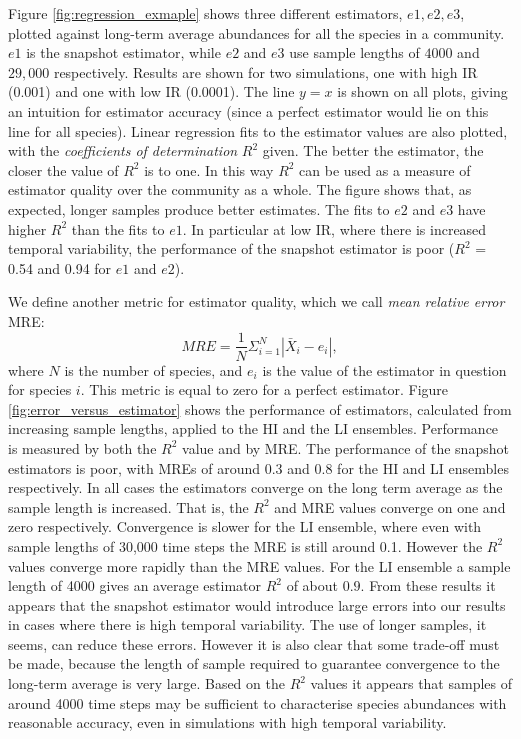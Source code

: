 Figure \ref{fig:regression_exmaple} shows three different estimators, $e1,e2,e3$, plotted against long-term average abundances for all the species in a community. $e1$ is the snapshot estimator, while $e2$ and $e3$ use sample lengths of $4000$ and $29,000$ respectively. Results are shown for two simulations, one with high IR (0.001) and one with low IR (0.0001). The line $y=x$ is shown on all plots, giving an intuition for estimator accuracy (since a perfect estimator would lie on this line for all species). Linear regression fits to the estimator values are also plotted, with the \emph{coefficients of determination} $R^2$ given. The better the estimator, the closer the value of $R^2$ is to one. In this way $R^2$ can be used as a measure of estimator quality over the community as a whole. The figure shows that, as expected, longer samples produce better estimates. The fits to $e2$ and $e3$ have higher $R^2$ than the fits to $e1$. In particular at low IR, where there is increased temporal variability, the performance of the snapshot estimator is poor ($R^2$ = 0.54 and 0.94 for $e1$ and $e2$).

 We define another metric for estimator quality, which we call \emph{mean relative error} MRE:
\begin{equation}
MRE = \frac{1}{N} \Sigma_{i=1}^N | \bar{X}_i - e_i |,
\label{eq:lta}
\end{equation}
%
where $N$ is the number of species, and $e_i$ is the value of the estimator in question for species $i$. This metric is equal to zero for a perfect estimator. Figure \ref{fig:error_versus_estimator} shows the performance of estimators, calculated from increasing sample lengths, applied to the HI and the LI ensembles. Performance is measured by both the $R^2$ value and by MRE. The performance of the snapshot estimators is poor, with MREs of around $0.3$ and $0.8$ for the HI and LI ensembles respectively. In all cases the estimators converge on the long term average as the sample length is increased. That is, the $R^2$ and MRE values converge on one and zero respectively. Convergence is slower for the LI ensemble, where even with sample lengths of 30,000 time steps the MRE is still around 0.1. However the $R^2$ values converge more rapidly than the MRE values. For the LI ensemble a sample length of 4000 gives an average estimator $R^2$ of about $0.9$. From these results it appears that the snapshot estimator would introduce large errors into our results in cases where there is high temporal variability. The use of longer samples, it seems, can reduce these errors. However it is also clear that some trade-off must be made, because the length of sample required to guarantee convergence to the long-term average is very large. Based on the $R^2$ values it appears that samples of around 4000 time steps may be sufficient to characterise species abundances with reasonable accuracy, even in simulations with high temporal variability.

